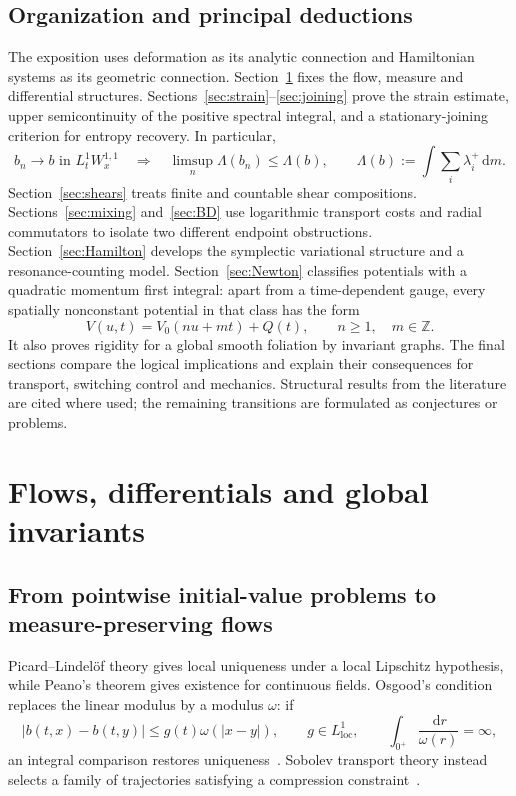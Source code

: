 \documentclass[review,12pt,times,a4paper,nopreprintline]{elsarticle}
\theoremstyle{plain}
\theoremstyle{definition}
\theoremstyle{remark}
\newcommand{\Z}{\mathbb Z}
\newcommand{\dd}{\,\mathrm d}
\numberwithin{equation}{section}
\begin{document}
\subsection{Organization and principal deductions}
The exposition uses deformation as its analytic connection and Hamiltonian systems as its geometric connection. Section~\ref{sec:framework} fixes the flow, measure and differential structures. Sections~\ref{sec:strain}--\ref{sec:joining} prove the strain estimate, upper semicontinuity of the positive spectral integral, and a stationary-joining criterion for entropy recovery. In particular,
\begin{equation}\label{eq:intromain}
 b_n\to b\text{ in }L^1_tW^{1,1}_x
 \quad\Longrightarrow\quad
 \limsup_n\Lambda(b_n)\leq\Lambda(b),
 \qquad \Lambda(b):=\int\sum_i\lambda_i^+\dd m.
\end{equation}
Section~\ref{sec:shears} treats finite and countable shear compositions. Sections~\ref{sec:mixing} and~\ref{sec:BD} use logarithmic transport costs and radial commutators to isolate two different endpoint obstructions. Section~\ref{sec:Hamilton} develops the symplectic variational structure and a resonance-counting model. Section~\ref{sec:Newton} classifies potentials with a quadratic momentum first integral: apart from a time-dependent gauge, every spatially nonconstant potential in that class has the form
\begin{equation}\label{eq:introclassification}
 V(u,t)=V_0(nu+mt)+Q(t),\qquad n\geq1,\quad m\in\Z.
\end{equation}
It also proves rigidity for a global smooth foliation by invariant graphs. The final sections compare the logical implications and explain their consequences for transport, switching control and mechanics. Structural results from the literature are cited where used; the remaining transitions are formulated as conjectures or problems.

\section{Flows, differentials and global invariants}\label{sec:framework}
\subsection{From pointwise initial-value problems to measure-preserving flows}
Picard--Lindel\"of theory gives local uniqueness under a local Lipschitz hypothesis, while Peano's theorem gives existence for continuous fields. Osgood's condition replaces the linear modulus by a modulus $\omega$: if
\[
 |b(t,x)-b(t,y)|\leq g(t)\omega(|x-y|),\qquad
 g\in L^1_{\mathrm{loc}},\qquad
 \int_{0^+}\frac{\dd r}{\omega(r)}=\infty,
\]
an integral comparison restores uniqueness~\cite{Teschl}. Sobolev transport theory instead selects a family of trajectories satisfying a compression constraint~\cite{DL,Ambrosio}.
\end{document}
